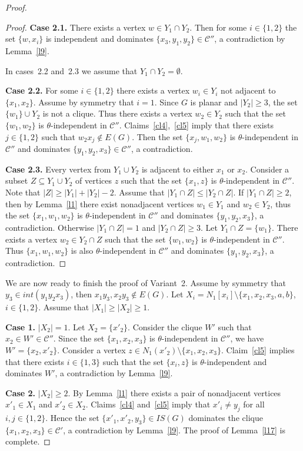 \documentclass[12pt]{article}
\begin{document}
\begin{proof}
\begin{proof}
\textbf{Case 2.1.} There exists a vertex $w \in Y_1 \cap Y_2$. Then for some $i \in \{1,2\}$ the set $\{w,x_i\}$ is independent and dominates $\{x_3,y_1,y_2\} \in \mathcal{C}''$, a contradiction by Lemma~\ref{l9}.

In cases~2.2 and~2.3 we assume that $Y_1 \cap Y_2 = \emptyset$.

\textbf{Case 2.2.} For some $i \in \{1,2\}$ there exists a vertex $w_i \in Y_i$ not adjacent to $\{x_1,x_2\}$. Assume by symmetry  that $i = 1$. Since $G$ is planar and $|Y_2| \geq 3$, the set $\{w_1\} \cup Y_2$ is not a clique. Thus there exists a vertex $w_2 \in Y_2$ such that the set $\{w_1,w_2\}$ is $\theta$-independent in $\mathcal{C}''$. Claims~\ref{cl4},~\ref{cl5} imply that there exists $j \in \{1,2\}$ such that $w_2x_j \notin E(G)$. Then the set $\{x_j,w_1,w_2\}$ is $\theta$-independent in $\mathcal{C}''$ and dominates $\{y_1,y_2,x_3\} \in \mathcal{C}''$, a contradiction.

\textbf{Case 2.3.} Every vertex from $Y_1 \cup Y_2$ is adjacent to either $x_1$ or $x_2$. Consider a subset $Z \subseteq Y_1 \cup Y_2$ of vertices $z$ such that the set $\{x_1,z\}$ is $\theta$-independent in $\mathcal{C}''$. Note that $|Z| \geq |Y_1| + |Y_2| - 2$. Assume that $|Y_1 \cap Z| \leq |Y_2 \cap Z|$. If $|Y_1 \cap Z| \geq 2$, then by Lemma~\ref{l1} there exist nonadjacent vertices $w_1 \in Y_1$ and $w_2 \in Y_2$, thus the set $\{x_1,w_1,w_2\}$ is $\theta$-independent in $\mathcal{C}''$ and dominates $\{y_1,y_2,x_3\}$, a contradiction. Otherwise $|Y_1 \cap Z| = 1$ and $|Y_2 \cap Z| \geq 3$. Let $ Y_1 \cap Z = \{w_1\}$. There exists a vertex $w_2 \in Y_2 \cap Z$ such that the set $\{w_1,w_2\}$ is $\theta$-independent in $\mathcal{C}''$. Thus $\{x_1,w_1,w_2\}$ is also $\theta$-independent in $\mathcal{C}''$ and dominates $\{y_1,y_2,x_3\}$, a contradiction.
\end{proof}

We are now ready to finish the proof of Variant~2. Assume by symmetry that $y_3 \in int(y_1y_2x_3)$, then $x_1y_3, x_2y_3 \notin E(G)$. Let $X_i = N_1[x_i] \setminus \{x_1,x_2,x_3,a,b\}$, $i \in \{1,2\}$. Assume that $|X_1| \geq |X_2| \geq 1$.

\textbf{Case 1.} $|X_2| = 1$. Let $X_2 = \{x'_2\}$. Consider the clique $W'$ such that $x_2 \in W' \in \mathcal{C}''$. Since the set $\{x_1,x_2,x_3\}$ is $\theta$-independent in $\mathcal{C}''$, we have $W' = \{x_2,x'_2\}$. Consider a vertex $z \in N_1(x'_2) \setminus \{x_1,x_2,x_3\}$. Claim~\ref{cl5} implies that there exists $i \in \{1,3\}$ such that the set $\{x_i,z\}$ is $\theta$-independent and dominates $W'$, a contradiction by Lemma~\ref{l9}.

\textbf{Case 2.} $|X_2| \geq 2$. By Lemma~\ref{l1} there exists a pair of nonadjacent vertices $x'_1 \in X_1$ and $x'_2 \in X_2$. Claims~\ref{cl4} and~\ref{cl5} imply that $x'_i \neq y_j$ for all $i,j \in \{1,2\}$. Hence the set $\{x'_1,x'_2,y_3\} \in IS(G)$ dominates the clique $\{x_1,x_2,x_3\} \in \mathcal{C}'$, a contradiction by Lemma~\ref{l9}. The proof of Lemma~\ref{l17} is complete.
\end{proof}
\end{document}
